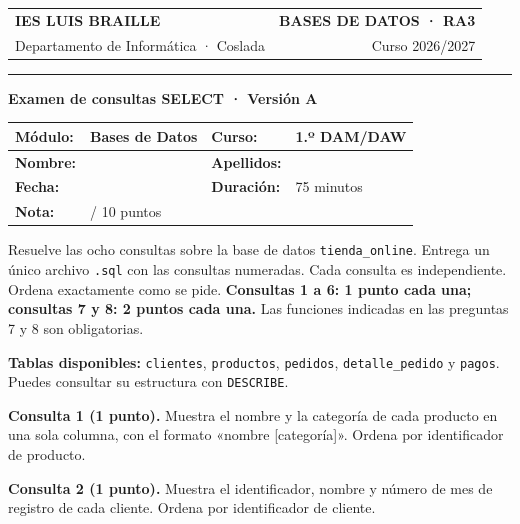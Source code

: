 \documentclass[12pt,a4paper]{article}
\begin{document}
\begin{tabularx}{\textwidth}{@{}Xr@{}}
{\color{primary}\Large\bfseries IES LUIS BRAILLE} & {\color{secondary}\bfseries BASES DE DATOS · RA3} \\
Departamento de Informática · Coslada & Curso 2026/2027 \\
\end{tabularx}
{\color{primary}\rule{\textwidth}{1.2pt}}
\begin{center}{\Large\bfseries Examen de consultas SELECT · Versión A}\end{center}
\vspace{0.2cm}
\begin{tabularx}{\textwidth}{|p{2.4cm}|X|p{2.2cm}|X|}
\hline
\textbf{Módulo:} & Bases de Datos & \textbf{Curso:} & 1.º DAM/DAW \\ \hline
\textbf{Nombre:} & & \textbf{Apellidos:} & \\ \hline
\textbf{Fecha:} & & \textbf{Duración:} & 75 minutos \\ \hline
\textbf{Nota:} & \multicolumn{3}{l|}{\hspace{2cm}/ 10 puntos} \\ \hline
\end{tabularx}
\vspace{0.35cm}
\begin{tcolorbox}[title=Instrucciones]
Resuelve las ocho consultas sobre la base de datos \texttt{tienda\_online}. Entrega un único archivo \texttt{.sql} con las consultas numeradas. Cada consulta es independiente. Ordena exactamente como se pide. \textbf{Consultas 1 a 6: 1 punto cada una; consultas 7 y 8: 2 puntos cada una.} Las funciones indicadas en las preguntas 7 y 8 son obligatorias.
\end{tcolorbox}
{\small\textbf{Tablas disponibles:} \texttt{clientes}, \texttt{productos}, \texttt{pedidos}, \texttt{detalle\_pedido} y \texttt{pagos}. Puedes consultar su estructura con \texttt{DESCRIBE}.}
\par\vspace{0.25cm}
\textbf{Consulta 1 (1 punto).} Muestra el nombre y la categoría de cada producto en una sola columna, con el formato «nombre [categoría]». Ordena por identificador de producto.\par\vspace{0.65em}
\textbf{Consulta 2 (1 punto).} Muestra el identificador, nombre y número de mes de registro de cada cliente. Ordena por identificador de cliente.\par\vspace{0.65em}
\end{document}
